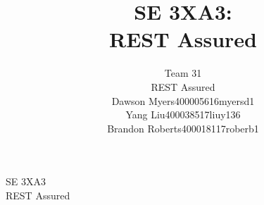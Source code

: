 \begin{titlepage}


\newcommand{\teamname}{REST Assured}
\newcommand{\teamnumber}{Team 31}

\newcommand{\course}{SE 3XA3}

\title{\course: \docTitle \\ \teamname}

\newcommand{\studentAname}{Dawson Myers}
\newcommand{\studentAsid}{400005616}
\newcommand{\studentAmid}{myersd1}
\newcommand{\studentAInfo}{\studentAname \studentAsid \studentAmid}

\newcommand{\studentBname}{Yang Liu}
\newcommand{\studentBsid}{400038517}
\newcommand{\studentBmid}{liuy136}
\newcommand{\studentBInfo}{\studentBname \studentBsid \studentBmid}

\newcommand{\studentCname}{Brandon Roberts}
\newcommand{\studentCsid}{400018117}
\newcommand{\studentCmid}{roberb1}
\newcommand{\studentCInfo}{\studentCname \studentCsid \studentCmid}


\author{\teamnumber
	\\ \teamname
	\\ \studentAInfo
	\\ \studentBInfo
	\\ \studentCInfo
}

\date{\dueDate}



\centering
\parbox[t]{0.97\linewidth}{
	\centering \fontsize{20pt}{25pt}\selectfont %

	\Large \course \\
	\huge \teamname \\
	\large\dueDate
	
}
\end{titlepage}
